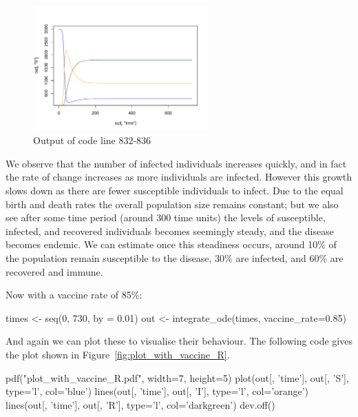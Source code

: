 \begin{figure}
\begin{center}
\includegraphics[width=0.6\textwidth]{./assets/plot_no_vaccine_R.pdf}
\end{center}
\caption{Output of code line 832-836}
\label{fig:plot_no_vaccine_R}
\end{figure}

We observe that the number of infected individuals increases quickly, and in
fact the rate of change increases as more individuals are infected. However
this growth slows down as there are fewer susceptible individuals to infect. Due
to the equal birth and death rates the overall population size remains constant;
but we also see after some time period (around 300 time units) the levels of
susceptible, infected, and recovered individuals becomes seemingly steady, and
the disease becomes endemic. We can estimate once this steadiness occurs, around
10\% of the population remain susceptible to the disease, 30\% are infected, and
60\% are recovered and immune.

Now with a vaccine rate of 85\%:

\begin{Rin}
times <- seq(0, 730, by = 0.01)
out <- integrate_ode(times, vaccine_rate=0.85)
\end{Rin}

And again we can plot these to visualise their behaviour. The following code
gives the plot shown in Figure~\ref{fig:plot_with_vaccine_R}.

\begin{Rin-no-test}
pdf("plot_with_vaccine_R.pdf", width=7, height=5) 
plot(out[, 'time'], out[, 'S'], type='l', col='blue')
lines(out[, 'time'], out[, 'I'], type='l', col='orange')
lines(out[, 'time'], out[, 'R'], type='l', col='darkgreen')
dev.off()
\end{Rin-no-test}


